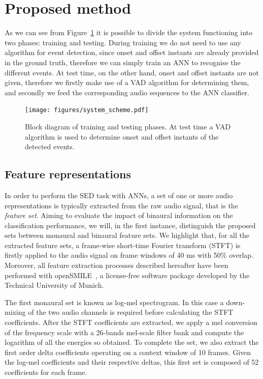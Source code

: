 \section{Proposed method}
\label{sec:prop_meth}

As we can see from Figure~\ref{fig:system_scheme} it is possible to divide the system functioning into two phases: training and testing. During training we do not need to use any algorithm for event detection, since onset and offset instants are already provided in the ground truth, therefore we can simply train an ANN to recognise the different events. At test time, on the other hand, onset and offset instants are not given, therefore we firstly make use of a VAD algorithm for determining them, and secondly we feed the corresponding audio sequences to the ANN classifier.

\begin{figure}[t]
	\centering
	\texttt{[image: figures/system\_scheme.pdf]}
	\caption{Block diagram of training and testing phases. At test time a VAD algorithm is used to determine onset and offset instants of the detected events.}
	\label{fig:system_scheme}
\end{figure}

\subsection{Feature representations}

In order to perform the SED task with ANNs, a set of one or more audio representations is typically extracted from the raw audio signal, that is the \emph{feature set}. Aiming to evaluate the impact of binaural information on the classification performance, we will, in the first instance, distinguish the proposed sets between monaural and binaural feature sets. We highlight that, for all the extracted feature sets, a frame-wise short-time Fourier transform (STFT) is firstly applied to the audio signal on frame windows of 40 ms with 50\% overlap. Moreover, all feature extraction processes described hereafter have been performed with openSMILE~\cite{eyben2013recent}, a license-free software package developed by the Technical University of Munich.

The first monaural set is known as log-mel spectrogram. In this case a down-mixing of the two audio channels is required before calculating the STFT coefficients. After the STFT coefficients are extracted, we apply a mel conversion of the frequency scale with a 26-bands mel-scale filter bank and compute the logarithm of all the energies so obtained. To complete the set, we also extract the first order delta coefficients operating on a context window of 10 frames. Given the log-mel coefficients and their respective deltas, this first set is composed of 52 coefficients for each frame.


